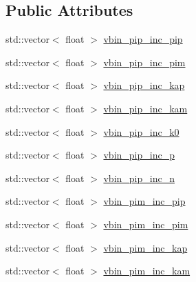 \subsection*{Public Attributes}
\begin{DoxyCompactItemize}
\item 
std\-::vector$<$ float $>$ \hyperlink{class_neutrino_flux_reweight_1_1_thin_target_meson_incident_reweighter_afb51aec44c86299cc25d2b67936fdaa0}{vbin\-\_\-pip\-\_\-inc\-\_\-pip}
\item 
std\-::vector$<$ float $>$ \hyperlink{class_neutrino_flux_reweight_1_1_thin_target_meson_incident_reweighter_aaf511004916c8cde16914f776bd24567}{vbin\-\_\-pip\-\_\-inc\-\_\-pim}
\item 
std\-::vector$<$ float $>$ \hyperlink{class_neutrino_flux_reweight_1_1_thin_target_meson_incident_reweighter_a313579b46a30eab2e8181bdbb616400b}{vbin\-\_\-pip\-\_\-inc\-\_\-kap}
\item 
std\-::vector$<$ float $>$ \hyperlink{class_neutrino_flux_reweight_1_1_thin_target_meson_incident_reweighter_a4b9a6dea5fa9006465b9869f7f5a7ef4}{vbin\-\_\-pip\-\_\-inc\-\_\-kam}
\item 
std\-::vector$<$ float $>$ \hyperlink{class_neutrino_flux_reweight_1_1_thin_target_meson_incident_reweighter_a4dc56ba2cd4aefe825f48334dc9fd570}{vbin\-\_\-pip\-\_\-inc\-\_\-k0}
\item 
std\-::vector$<$ float $>$ \hyperlink{class_neutrino_flux_reweight_1_1_thin_target_meson_incident_reweighter_a094b50773eedca4a30e58067d55b61c7}{vbin\-\_\-pip\-\_\-inc\-\_\-p}
\item 
std\-::vector$<$ float $>$ \hyperlink{class_neutrino_flux_reweight_1_1_thin_target_meson_incident_reweighter_a709b2752b6bf405c479a985a136a8c5e}{vbin\-\_\-pip\-\_\-inc\-\_\-n}
\item 
std\-::vector$<$ float $>$ \hyperlink{class_neutrino_flux_reweight_1_1_thin_target_meson_incident_reweighter_a91fcf6a2aae6942bca236752fa38af15}{vbin\-\_\-pim\-\_\-inc\-\_\-pip}
\item 
std\-::vector$<$ float $>$ \hyperlink{class_neutrino_flux_reweight_1_1_thin_target_meson_incident_reweighter_ad9fb46f9b120a879ab057578902ba63e}{vbin\-\_\-pim\-\_\-inc\-\_\-pim}
\item 
std\-::vector$<$ float $>$ \hyperlink{class_neutrino_flux_reweight_1_1_thin_target_meson_incident_reweighter_adb7bd7bf69b005ef32845bf80d0dcff3}{vbin\-\_\-pim\-\_\-inc\-\_\-kap}
\item 
std\-::vector$<$ float $>$ \hyperlink{class_neutrino_flux_reweight_1_1_thin_target_meson_incident_reweighter_a1673f9e513edfa4f1435c572870d3b84}{vbin\-\_\-pim\-\_\-inc\-\_\-kam}

\end{DoxyCompactItemize}

